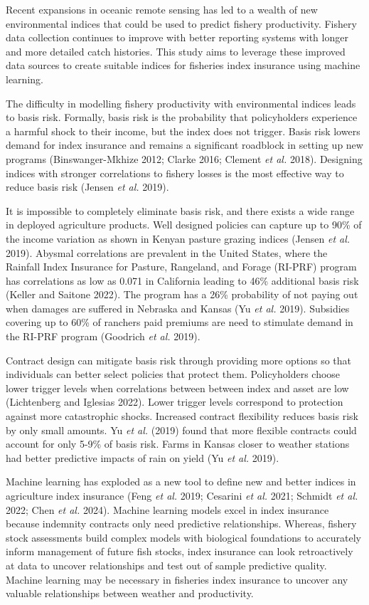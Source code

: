 \documentclass[
  letterpaper,
  DIV=11,
  numbers=noendperiod]{scrartcl}
\begin{document}
Recent expansions in oceanic remote sensing has led to a wealth of new
environmental indices that could be used to predict fishery
productivity. Fishery data collection continues to improve with better
reporting systems with longer and more detailed catch histories. This
study aims to leverage these improved data sources to create suitable
indices for fisheries index insurance using machine learning.

The difficulty in modelling fishery productivity with environmental
indices leads to basis risk. Formally, basis risk is the probability
that policyholders experience a harmful shock to their income, but the
index does not trigger. Basis risk lowers demand for index insurance and
remains a significant roadblock in setting up new programs
(Binswanger-Mkhize 2012; Clarke 2016; Clement \emph{et al.} 2018).
Designing indices with stronger correlations to fishery losses is the
most effective way to reduce basis risk (Jensen \emph{et al.} 2019).

It is impossible to completely eliminate basis risk, and there exists a
wide range in deployed agriculture products. Well designed policies can
capture up to 90\% of the income variation as shown in Kenyan pasture
grazing indices (Jensen \emph{et al.} 2019). Abysmal correlations are
prevalent in the United States, where the Rainfall Index Insurance for
Pasture, Rangeland, and Forage (RI-PRF) program has correlations as low
as 0.071 in California leading to 46\% additional basis risk (Keller and
Saitone 2022). The program has a 26\% probability of not paying out when
damages are suffered in Nebraska and Kansas (Yu \emph{et al.} 2019).
Subsidies covering up to 60\% of ranchers paid premiums are need to
stimulate demand in the RI-PRF program (Goodrich \emph{et al.} 2019).

Contract design can mitigate basis risk through providing more options
so that individuals can better select policies that protect them.
Policyholders choose lower trigger levels when correlations between
between index and asset are low (Lichtenberg and Iglesias 2022). Lower
trigger levels correspond to protection against more catastrophic
shocks. Increased contract flexibility reduces basis risk by only small
amounts. Yu \emph{et al.} (2019) found that more flexible contracts
could account for only 5-9\% of basis risk. Farms in Kansas closer to
weather stations had better predictive impacts of rain on yield (Yu
\emph{et al.} 2019).

Machine learning has exploded as a new tool to define new and better
indices in agriculture index insurance (Feng \emph{et al.} 2019;
Cesarini \emph{et al.} 2021; Schmidt \emph{et al.} 2022; Chen \emph{et
al.} 2024). Machine learning models excel in index insurance because
indemnity contracts only need predictive relationships. Whereas, fishery
stock assessments build complex models with biological foundations to
accurately inform management of future fish stocks, index insurance can
look retroactively at data to uncover relationships and test out of
sample predictive quality. Machine learning may be necessary in
fisheries index insurance to uncover any valuable relationships between
weather and productivity.
\end{document}
